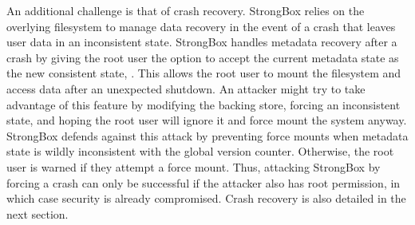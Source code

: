 An additional challenge is that of crash recovery. StrongBox relies on the
overlying filesystem to manage data recovery in the event of a crash that leaves
user data in an inconsistent state. StrongBox handles metadata recovery after a
crash by giving the root user the option to accept the current metadata state as
the new consistent state, . This allows the root user to
mount the filesystem and access data after an unexpected shutdown. An attacker
might try to take advantage of this feature by modifying the backing store,
forcing an inconsistent state, and hoping the root user will ignore it and force
mount the system anyway. StrongBox defends against this attack by preventing
force mounts when metadata state is wildly inconsistent with the global version
counter. Otherwise, the root user is warned if they attempt a force mount. Thus,
attacking StrongBox by forcing a crash can only be successful if the attacker
also has root permission, in which case security is already compromised. Crash
recovery is also detailed in the next section.
